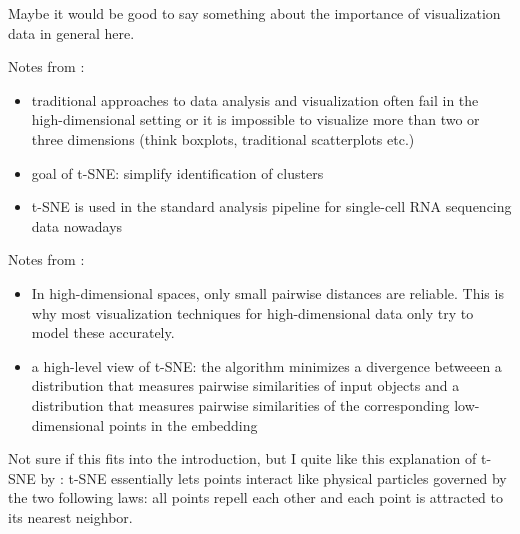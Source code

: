 Maybe it would be good to say something about the importance of visualization data in general here. 

Notes from \cite{LinStei22}:
\begin{itemize}
    \item traditional approaches to data analysis and visualization often fail in the high-dimen\-sio\-nal setting or it is impossible to visualize more than two or three dimensions (think boxplots, traditional scatterplots etc.)
    \item goal of t-SNE: simplify identification of clusters 
    \item t-SNE is used in the standard analysis pipeline for single-cell RNA sequencing data nowadays
\end{itemize}

Notes from \cite{vdMaa14}:
\begin{itemize}
    \item In high-dimensional spaces, only small pairwise distances are reliable. This is why most visualization techniques for high-dimensional data only try to model these accurately. 
    \item a high-level view of t-SNE: the algorithm minimizes a divergence betweeen a distribution that measures pairwise similarities of input objects and a distribution that measures pairwise similarities of the corresponding low-dimensional points in the embedding 
\end{itemize}

Not sure if this fits into the introduction, but I quite like this explanation of t-SNE by \cite{KoBe19SingleCell}: t-SNE essentially lets points interact like physical particles governed by the two following laws: all points repell each other and each point is attracted to its nearest neighbor.

